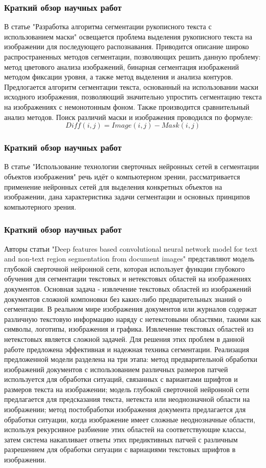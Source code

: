 \documentclass[
	fullscreen=true, 
	bookmarks=false,
	sans serif,
	9pt,
	pdf,
	hyperref={
		pdfpagelabels=false,
		unicode=true
	}
]{beamer}
\begin{document}
	\begin{frame}[fragile]\frametitle{Краткий обзор научных работ}	
        В статье "Разработка алгоритма сегментации рукописного текста с использованием маски" освещается проблема выделения рукописного текста на изображении для последующего распознавания. Приводится описание широко распространенных методов сегментации, позволяющих решить данную проблему: метод цветового анализа изображений, бинарная сегментация изображений методом фиксации уровня, а также метод выделения и анализа контуров. Предлогается алгоритм сегментации текста, основанный на использовании маски исходного изображения, позволяющий значительно упростить сегментацию текста на изображениях с немонотонным фоном. Также производится сравнительный анализ методов. Поиск различий маски и изображения проводился по формуле:
        \[ Diff(i, j) = Image(i, j) - Mask(i, j) \]
	\end{frame}
	
	\begin{frame}[fragile]\frametitle{Краткий обзор научных работ}	
        В статье "Использование технологии сверточных нейронных сетей в сегментации объектов изображения" речь идёт о компьютерном зрении, рассматривается применение нейронных сетей для выделения конкретных объектов на изображении, дана характеристика задачи сегментации и основных принципов компьютерного зрения.
	\end{frame}
	
	\begin{frame}[fragile]\frametitle{Краткий обзор научных работ}	
        Авторы статьи "Deep features based convolutional neural network model for text and non-text region segmentation from document images" представляют модель глубокой сверточной нейронной сети, которая использует функции глубокого обучения для сегментации текстовых и нетекстовых областей на изображениях документов. Основная задача - извлечение текстовых областей из изображений документов сложной компоновки без каких-либо предварительных знаний о сегментации. В реальном мире изображения документов или журналов содержат различную текстовую информацию наряду с нетекстовыми областями, такими как символы, логотипы, изображения и графика. Извлечение текстовых областей из нетекстовых является сложной задачей. Для решения этих проблем в данной работе предложена эффективная и надежная техника сегментации. Реализация предложенной модели разделена на три этапа: метод предварительной обработки изображений документов с использованием различных размеров патчей используется для обработки ситуаций, связанных с вариантами шрифтов и размеров текста на изображении; модель глубокой сверточной нейронной сети предлагается для предсказания текста, нетекста или неоднозначной области на изображении; метод постобработки изображения документа предлагается для обработки ситуации, когда изображение имеет сложные неоднозначные области, используя рекурсивное разбиение этих областей на соответствующие классы, затем система накапливает ответы этих предиктивных патчей с различным разрешением для обработки ситуации с вариациями текстовых шрифтов в изображении.
	\end{frame}
	
\end{document}
